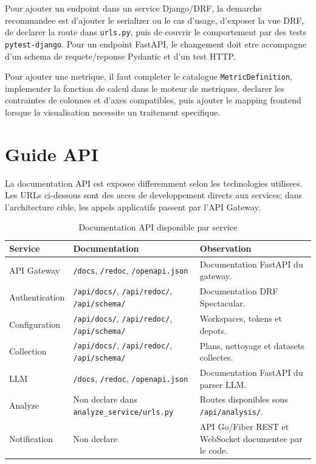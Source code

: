 Pour ajouter un endpoint dans un service Django/DRF, la demarche recommandee est d'ajouter le
serializer ou le cas d'usage, d'exposer la vue DRF, de declarer la route dans \texttt{urls.py},
puis de couvrir le comportement par des tests \texttt{pytest-django}. Pour un endpoint FastAPI,
le changement doit etre accompagne d'un schema de requete/reponse Pydantic et d'un test HTTP.

Pour ajouter une metrique, il faut completer le catalogue \texttt{MetricDefinition}, implementer
la fonction de calcul dans le moteur de metriques, declarer les contraintes de colonnes et d'axes
compatibles, puis ajouter le mapping frontend lorsque la visualisation necessite un traitement
specifique.

\section{Guide API}

La documentation API est exposee differemment selon les technologies utilisees. Les URLs ci-dessous
sont des acces de developpement directs aux services; dans l'architecture cible, les appels
applicatifs passent par l'API Gateway.

\begin{table}[H]
\centering
\small
\caption{Documentation API disponible par service}
\label{tab:annexe-doc-api}
\begin{tabular}{|>{\raggedright\arraybackslash}p{4cm}
                |>{\raggedright\arraybackslash}p{5cm}
                |>{\raggedright\arraybackslash}p{5cm}|}
\hline
\textbf{Service} & \textbf{Documentation} & \textbf{Observation} \\
\hline
API Gateway & \texttt{/docs}, \texttt{/redoc}, \texttt{/openapi.json} & Documentation FastAPI du gateway. \\
\hline
Authentication & \texttt{/api/docs/}, \texttt{/api/redoc/}, \texttt{/api/schema/} & Documentation DRF Spectacular. \\
\hline
Configuration & \texttt{/api/docs/}, \texttt{/api/redoc/}, \texttt{/api/schema/} & Workspaces, tokens et depots. \\
\hline
Collection & \texttt{/api/docs/}, \texttt{/api/redoc/}, \texttt{/api/schema/} & Plans, nettoyage et datasets collectes. \\
\hline
LLM & \texttt{/docs}, \texttt{/redoc}, \texttt{/openapi.json} & Documentation FastAPI du parser LLM. \\
\hline
Analyze & Non declare dans \texttt{analyze\_service/urls.py} & Routes disponibles sous \texttt{/api/analysis/}. \\
\hline
Notification & Non declare & API Go/Fiber REST et WebSocket documentee par le code. \\
\hline
\end{tabular}
\end{table}

